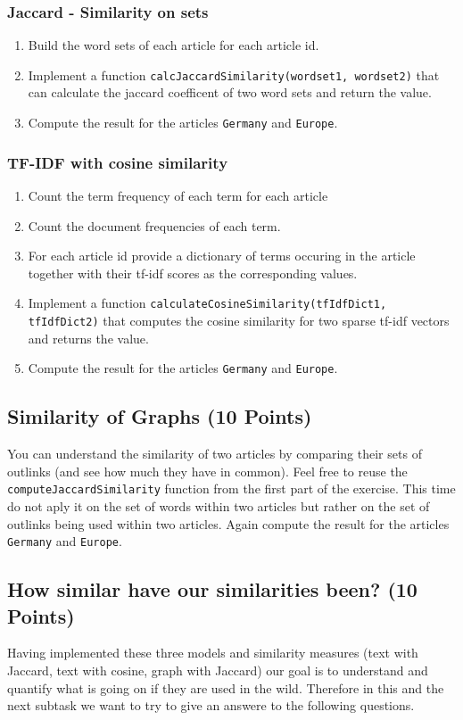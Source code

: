\documentclass{WeSTassignment}
\begin{document}
\subsubsection{Jaccard - Similarity on sets}
\begin{enumerate}
\item Build the word sets of each article for each article id.
\item Implement a function \texttt{calcJaccardSimilarity(wordset1, wordset2)} that can calculate the jaccard coefficent of two word sets and return the value.
\item Compute the result for the articles \texttt{Germany} and \texttt{Europe}.
\end{enumerate}

\subsubsection{TF-IDF with cosine similarity}
\begin{enumerate}
\item Count the term frequency of each term for each article
\item Count the document frequencies of each term. 
\item For each article id provide a dictionary of terms occuring in the article together with their tf-idf scores as the corresponding values.
\item Implement a function \texttt{calculateCosineSimilarity(tfIdfDict1, tfIdfDict2)} that computes the cosine similarity for two sparse tf-idf vectors and returns the value.
\item Compute the result for the articles \texttt{Germany} and \texttt{Europe}.
\end{enumerate}

\subsection{Similarity of Graphs (10 Points)}
You can understand the similarity of two articles by comparing their sets of outlinks (and see how much they have in common). Feel free to reuse the \texttt{computeJaccardSimilarity} function from the first part of the exercise. This time do not aply it on the set of words within two articles but rather on the set of outlinks being used within two articles. Again compute the result for the articles \texttt{Germany} and \texttt{Europe}.

\subsection{How similar have our similarities been? (10 Points)}
Having implemented these three models and similarity measures (text with Jaccard, text with cosine, graph with Jaccard) our goal is to understand and quantify what is going on if they are used in the wild. Therefore in this and the next subtask we want to try to give an answere to the following questions.
\end{document}
